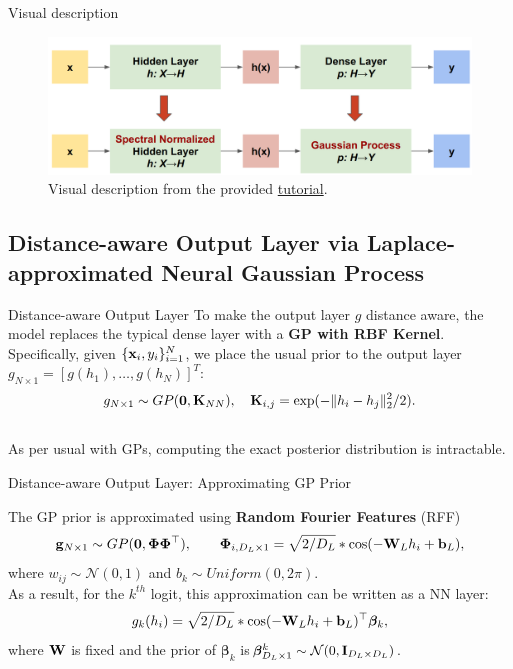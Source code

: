 \documentclass[xcolor=table]{beamer}
\DeclarePairedDelimiter\norm{\lVert}{\rVert}%
\begin{document}
\begin{frame}{Visual description}
\begin{figure}
    \centering
    \includegraphics[scale=0.2]{fig/sngp.png}
    \caption{Visual description from the provided \href{https://colab.research.google.com/github/tensorflow/docs/blob/master/site/en/tutorials/understanding/sngp.ipynb}{tutorial}.}
    \label{fig:description}
\end{figure}
    
\end{frame}

\subsection{Distance-aware Output Layer via Laplace-approximated Neural Gaussian Process}

\begin{frame}{Distance-aware Output Layer}
To make the output layer \(g\) distance aware, the model replaces the typical dense layer with a \textbf{GP with RBF Kernel}. \\
\vspace{1cm}
Specifically, given \(\{{\mathbf x}_i,y_i\}_{i=1}^N\), we place the usual prior to the output layer \(g_{N \times 1}=[g(h_1),\dots,g(h_N)]^T\):
\[
g_{N \times 1} \sim GP(\mathbf{0}, \bK_{NN}), \quad \bK_{i,j} = \exp(-\norm{h_i-h_j}_2^2/2).
\]
\\
\pause
As per usual with GPs, computing the exact posterior distribution is intractable.
    
\end{frame}

\begin{frame}{Distance-aware Output Layer: Approximating GP Prior}

The GP prior is approximated using \textbf{Random Fourier Features} (RFF)
\[
    {\mathbf g}_{N \times 1} \sim GP({\mathbf 0}, {\boldsymbol{\Phi}}{\boldsymbol{\Phi}}^\top), 
     \qquad 
    {\boldsymbol{\Phi}}_{i, D_L \times 1} = 
    \sqrt{2/D_L} * 
    \cos(-{\mathbf W}_L h_i + {\mathbf b}_L),
    \label{eq:rff_gp}
\]
where \(w_{ij} \sim \mathcal N(0,1)\) and \(b_k \sim Uniform(0,2\pi)\).\\
\pause
As a result, for the \(k^{th}\) logit, this approximation can be written as a NN layer:
\[
    g_k(h_i) = \sqrt{2/D_L} * \cos(-{\mathbf W}_L h_i + {\mathbf b}_L)^\top {\boldsymbol{\beta}}_k, 
\]
where \({\mathbf W}\) is fixed and the prior of \(\mathbf \beta_k\) is\({\boldsymbol{\beta}}^k_{D_L \times 1} \sim \mathcal N(0, \mathbf I_{D_L \times D_L})\).\\
\end{frame}
\end{document}

